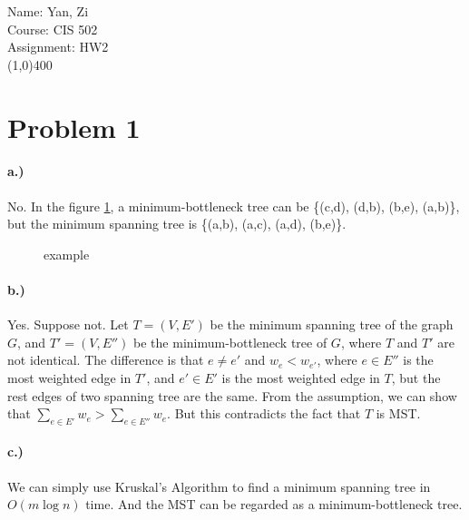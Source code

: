 \documentclass[letter,12pt]{article}
\begin{document}
Name: Yan, Zi \\
Course: CIS 502 \\
Assignment: HW2 \\
\line(1,0){400}


\section*{Problem 1}
\paragraph*{a.)}
No.
In the figure \ref{p1a}, a minimum-bottleneck tree can be \{(c,d), (d,b),
(b,e), (a,b)\}, but the minimum spanning tree is \{(a,b), (a,c), (a,d),
(b,e)\}. 

\begin{figure}[!h]
\caption{example}
\label{p1a}
\center
{}
\end{figure}

\paragraph*{b.)}
Yes.
Suppose not. Let $T=(V, E')$ be the minimum spanning tree of the 
graph $G$, and $T'=(V, E'')$ be the minimum-bottleneck tree of $G$,
where $T$ and $T'$ are not identical. The difference is that $e \neq e'$
and $w_e < w_{e'}$, where $e \in E''$ is the most weighted edge in $T'$,
and $e' \in E'$ is the most weighted edge in $T$, but the rest edges of
two spanning tree are the same. From the assumption, we can show
that $\sum\limits_{e \in E'} w_e > \sum\limits_{e \in E''} w_e$. But this 
contradicts the fact that $T$ is MST.

\paragraph*{c.)} We can simply use Kruskal's Algorithm to find a 
minimum spanning tree in $O(m\log n)$ time. And the MST can be
regarded as a minimum-bottleneck tree.
\end{document}
